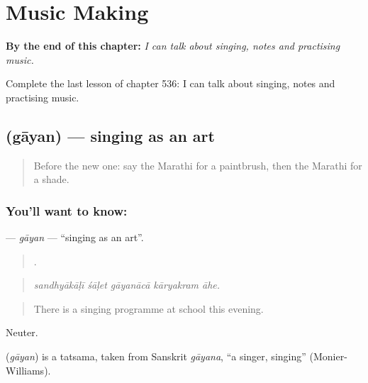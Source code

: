 
\chapter{Music Making}
\label{ch:mr-music-making}

\begin{chapteropening}
\textbf{By the end of this chapter:} \emph{I can talk about singing, notes and practising music.}

Complete the last lesson of chapter 536: I can talk about singing, notes and practising music.
\end{chapteropening}

\section[\texorpdfstring{\mr{गायन} (gāyan)}{गायन (gāyan)}]{ (gāyan) — singing as an art}

\label{lesson:MR-C536-gayan}



\begin{quote}
Before the new one: say the Marathi for a paintbrush, then the Marathi for a shade.
\end{quote}

\subsection*{You'll want to know: }
\textbf{} — \emph{gāyan} — \textquotedblleft{}singing as an art\textquotedblright{}.

\begin{quote}
    .
\end{quote}

\begin{quote}
\emph{sandhyākāḷī śāḷet gāyanācā kāryakram āhe.}
\end{quote}

\begin{quote}
There is a singing programme at school this evening.
\end{quote}

Neuter.

\begin{cousinweb}
\textbf{} (\emph{gāyan}) is a tatsama, taken from Sanskrit \emph{gāyana}, \textquotedblleft{}a singer, singing\textquotedblright{} (Monier-Williams).
\end{cousinweb}

